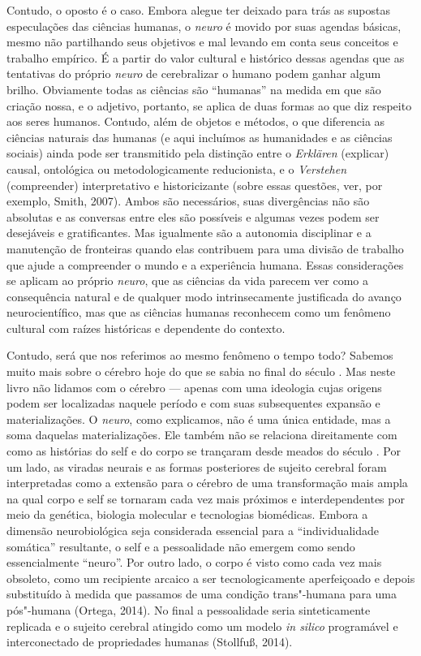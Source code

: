 Contudo, o oposto é o caso. Embora alegue ter deixado para trás as
supostas especulações das ciências humanas, o \emph{neuro} é movido por
suas agendas básicas, mesmo não partilhando seus objetivos e mal levando
em conta seus conceitos e trabalho empírico. É a partir do valor
cultural e histórico dessas agendas que as tentativas do próprio
\emph{neuro} de cerebralizar o humano podem ganhar algum brilho.
Obviamente todas as ciências são ``humanas'' na medida em que são
criação nossa, e o adjetivo, portanto, se aplica de duas formas ao que
diz respeito aos seres humanos. Contudo, além de objetos e métodos, o
que diferencia as ciências naturais das humanas (e aqui incluímos as
humanidades e as ciências sociais) ainda pode ser transmitido pela
distinção entre o \emph{Erklären} (explicar) causal, ontológica ou
metodologicamente reducionista, e o \emph{Verstehen} (compreender)
interpretativo e historicizante (sobre essas questões, ver, por exemplo,
Smith, 2007). Ambos são necessários, suas divergências não são absolutas
e as conversas entre eles são possíveis e algumas vezes podem ser
desejáveis e gratificantes. Mas igualmente são a autonomia disciplinar e
a manutenção de fronteiras quando elas contribuem para uma divisão de
trabalho que ajude a compreender o mundo e a experiência humana. Essas
considerações se aplicam ao próprio \emph{neuro}, que as ciências da
vida parecem ver como a consequência natural e de qualquer modo
intrinsecamente justificada do avanço neurocientífico, mas que as
ciências humanas reconhecem como um fenômeno cultural com raízes
históricas e dependente do contexto.

Contudo, será que nos referimos ao mesmo fenômeno o tempo todo? Sabemos
muito mais sobre o cérebro hoje do que se sabia no final do século .
Mas neste livro não lidamos com o cérebro --- apenas com uma ideologia
cujas origens podem ser localizadas naquele período e com suas
subsequentes expansão e materializações. O \emph{neuro}, como
explicamos, não é uma única entidade, mas a soma daquelas
materializações. Ele também não se relaciona direitamente com como as
histórias do self e do corpo se trançaram desde meados do século . Por
um lado, as viradas neurais e as formas posteriores de sujeito cerebral
foram interpretadas como a extensão para o cérebro de uma transformação
mais ampla na qual corpo e self se tornaram cada vez mais próximos e
interdependentes por meio da genética, biologia molecular e tecnologias
biomédicas. Embora a dimensão neurobiológica seja considerada essencial
para a ``individualidade somática'' resultante, o self e a pessoalidade
não emergem como sendo essencialmente ``neuro''. Por outro lado, o corpo
é visto como cada vez mais obsoleto, como um recipiente arcaico a ser
tecnologicamente aperfeiçoado e depois substituído à medida que passamos
de uma condição trans"-humana para uma pós"-humana (Ortega, 2014). No
final a pessoalidade seria sinteticamente replicada e o sujeito cerebral
atingido como um modelo \emph{in silico} programável e interconectado de
propriedades humanas (Stollfuß, 2014).

